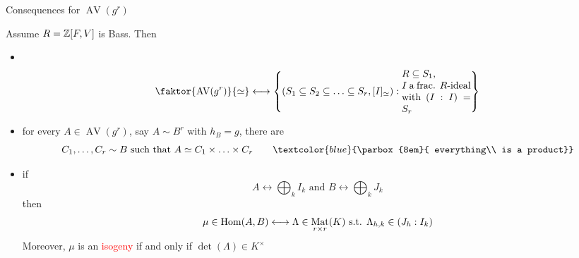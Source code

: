 \documentclass[usenames,dvipsnames,handout]{beamer}
\DeclareMathOperator{\AV}{AV}
\DeclareMathOperator{\Mat}{Mat}
\newcommand{\red}[1]{\textcolor{red}{#1}}
\newcommand{\blue}[1]{\textcolor{blue}{#1}}
\begin{document}
\begin{frame}{ Consequences for $\AV(g^r)$ }
\begin{corollary}
Assume $R=\mathbb{Z}[F,V]$ is Bass.
Then
 \begin{itemize}
  \pause \item \ 
  \vspace{-1em}
  \[ \faktor{\AV(g^r)}{ \simeq } \longleftrightarrow \set{ (S_1\subseteq S_2 \subseteq \ldots \subseteq S_r , [I]_{\simeq}) : \parbox{7em}{$R\subseteq S_1$,\\ $I$ a frac. $R$-ideal with $(I:I)=S_r$}  } \]
  \pause \item for every $A\in \AV(g^r)$, say $A\sim B^r$ with $h_B=g$, there are 
  \vspace{-1em}
  \[C_1,\ldots,C_r \sim B \text{ such that } A \simeq C_1\times \ldots \times C_r \qquad\blue{\parbox{8em}{ everything\\ is a product}} \]
  \vspace{-1em}
  \pause \item if 
  \vspace{-1em}
  \[ A \longleftrightarrow \bigoplus_k I_k \text{ and } B \longleftrightarrow \bigoplus_k J_k \]
  \vspace{-1em}
  then 
  \vspace{-1em}
  \[ \mu \in \Hom(A,B) \longleftrightarrow \Lambda \in \Mat_{r\times r}(K) \text{ s.t. } \Lambda_{h,k}\in (J_h:I_k) \]
  \pause Moreover, $\mu$ is an \red{isogeny} if and only if $\det(\Lambda) \in K^\times$
 \end{itemize}
\end{corollary}
\end{frame}
\end{document}
